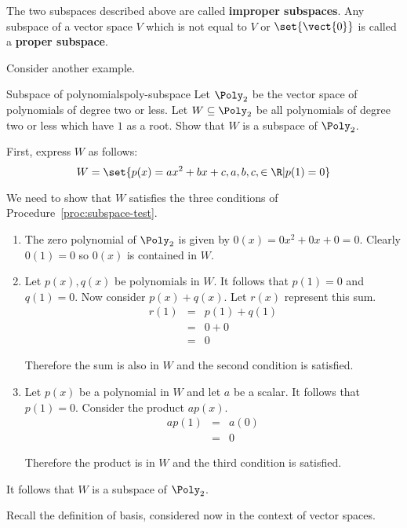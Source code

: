 The two subspaces described above are called \textbf{improper subspaces}. Any subspace of a vector space $V$ which is not equal to $V$ or  $\set{\vect{0} }$ is called a \textbf{proper subspace}. 

Consider another example.

\begin{example}{Subspace of polynomials}{poly-subspace}
Let $\Poly_2$ be the vector space of polynomials of degree two or less. Let $W \subseteq \Poly_2$ be all polynomials of degree two or less which have $1$ as a root. Show that $W$ is a subspace of $\Poly_2$. 
\end{example}

\begin{solution}
First, express $W$ as follows:
\[
W = \set{p(x) = ax^2 +bx +c, a,b,c, \in \R | p(1)  = 0 }
\]

We need to show that $W$ satisfies the three conditions of Procedure~\ref{proc:subspace-test}. 
\begin{enumerate}
\item
The zero polynomial of $\Poly_2$ is given by $0(x) = 0x^2 + 0x + 0 = 0$. Clearly $0(1) = 0$ so $0(x)$ is contained in $W$. 

\item
Let $p(x), q(x)$ be polynomials in $W$.  It follows that $p(1) = 0 $ and $q(1) = 0$. Now consider $p(x) + q(x)$. Let $r(x)$ represent this sum.
\begin{eqnarray*}
r(1) &=& p(1) + q(1) \\
&=& 0 + 0 \\
&=& 0
\end{eqnarray*}

Therefore the sum is also in $W$ and the second condition is satisfied. 

\item
Let $p(x)$ be a polynomial in $W$ and let $a$ be a scalar. It follows that $p(1) = 0$. Consider the product $ap(x)$. 
\begin{eqnarray*}
ap(1) &=& a(0) \\
&=& 0
\end{eqnarray*}

Therefore the product is in $W$ and the third condition is satisfied.
\end{enumerate}

It follows that $W$ is a subspace of $\Poly_2$. 
\end{solution} 

Recall the definition of basis, considered now in the context of vector spaces.

